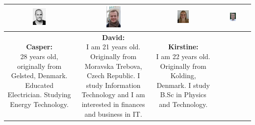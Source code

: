 \begin{table}[h]
\centering
\begin{tabular}{|c|c|c|c|}
\hline
\includegraphics[width=0.2\textwidth]{graphics/cgopic} & %
\includegraphics[width=0.2\textwidth]{graphics/david1} & %
\includegraphics[width=0.2\textwidth]{graphics/Kirstine} & %
\includegraphics[width=0.2\textwidth]{graphics/Nikolaj_profile} \\ \hline %
\parbox[t] {0.2\textwidth}{
\textbf{Casper:} \\
28 years old, originally from Gelsted, Denmark. Educated Electrician. Studying Energy Technology.
}

&

\parbox[t] {0.2\textwidth}{
\textbf{David:} \\
I am 21 years old. Originally from Moravska Trebova, Czech Republic. I study Information Technology and I am interested in finances and business in IT.
} 

&

\parbox[t] {0.2\textwidth}{
\textbf{Kirstine:} \\
I am 22 years old. Originally from Kolding, Denmark. I study B.Sc in Physics and Technology.
} 


\end{tabular}
\end{table}
